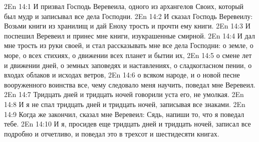 \vs 2En 14:1
И призвал Господь Веревеила, одного из архангелов Своих, который был мудр и записывал все дела Господни.
\vs 2En 14:2
И сказал Господь Веревеилу: Возьми книги из хранилищ и дай Еноху трость и прочти ему книги.
\vs 2En 14:3
И поспешил Веревеил и принес мне книги, изукрашенные смирной.
\vs 2En 14:4
И дал мне трость из руки своей, и стал рассказывать мне все дела Господни: о земле, о море, о всех стихиях, о движении всех планет и бытии их,
\vs 2En 14:5
о смене лет и движении дней, о земных заповедях и наставлениях, о сладкогласном пении, о входах облаков и исходах ветров,
\vs 2En 14:6
о всяком народе, и о новой песне вооруженного воинства все, чему следовало меня научить, поведал мне Веревеил.
\vs 2En 14:7
Тридцать дней и тридцать ночей говорили уста его, не умолкая.
\vs 2En 14:8
И я не спал тридцать дней и тридцать ночей, записывая все знаками.
\vs 2En 14:9
Когда же закончил, сказал мне Веревеил: Сядь, напиши то, что я поведал тебе.
\vs 2En 14:10
И я, просидев еще тридцать дней и тридцать ночей, записал все подробно и отчетливо, и поведал это в трехсот и шестидесяти книгах.

